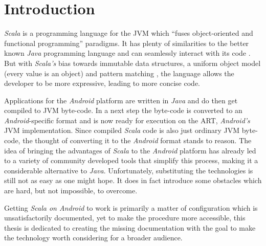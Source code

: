 \section{Introduction}

\textit{Scala} is a programming language for the \acf{JVM} which \enquote{fuses object-oriented and functional programming} \cite[p. 1]{odersky04} paradigms. It has plenty of similarities to the better known \textit{Java} programming language and can seamlessly interact with its code \cite[p. 2]{odersky04}. But with \textit{Scala's} bias towards immutable data structures, a uniform object model (every value is an object) \cite[p. 3]{odersky04} and pattern matching \cite[p. 13]{odersky04}, the language allows the developer to be more expressive, leading to more concise code.

Applications for the \textit{Android} platform are written in \textit{Java} and do then get compiled to \ac{JVM} byte-code. In a next step the byte-code is converted to an \textit{Android}-specific format and is now ready for execution on the \acf{ART}, \textit{Android's} \ac{JVM} implementation. Since compiled \textit{Scala} code is also just ordinary \ac{JVM} byte-code, the thought of converting it to the \textit{Android} format stands to reason. The idea of bringing the advantages of \textit{Scala} to the \textit{Android} platform has already led to a variety of community developed tools that simplify this process, making it a considerable alternative to \textit{Java}. Unfortunately, substituting the technologies is still not as easy as one might hope. It does in fact introduce some obstacles which are hard, but not impossible, to overcome.

Getting \textit{Scala on Android} to work is primarily a matter of configuration which is unsatisfactorily documented, yet to make the procedure more accessible, this thesis is dedicated to creating the missing documentation with the goal to make the technology worth considering for a broader audience.